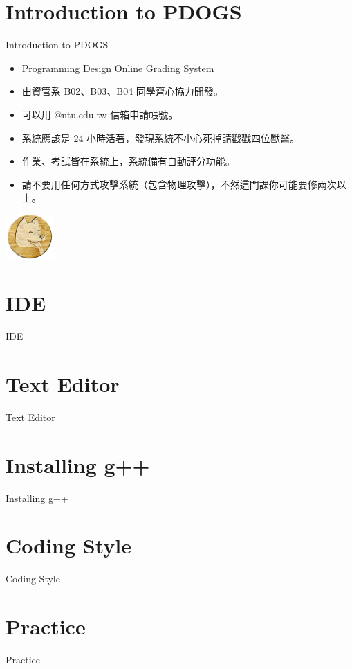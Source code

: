 \documentclass[t]{beamer}
\begin{document}
\section{Introduction to PDOGS}
\begin{frame}{Introduction to PDOGS}
\begin{itemize}
\item Programming Design Online Grading System
\item 由資管系 B02、B03、B04 同學齊心協力開發。
\item 可以用 @ntu.edu.tw 信箱申請帳號。
\item 系統應該是 24 小時活著，發現系統不小心死掉請戳戳四位獸醫。
\item 作業、考試皆在系統上，系統備有自動評分功能。
\item 請不要用任何方式攻擊系統（包含物理攻擊），不然這門課你可能要修兩次以上。
\end{itemize}
\begin{center}
\includegraphics[width=5em]{pdogs.png}
\end{center}
\end{frame}

\section{IDE}
\begin{frame}{IDE}
\end{frame}

\section{Text Editor}
\begin{frame}{Text Editor}
\end{frame}

\section{Installing g++}
\begin{frame}{Installing g++}
\end{frame}

\section{Coding Style}
\begin{frame}{Coding Style}
\end{frame}

\section{Practice}
\begin{frame}{Practice}
\end{frame}
\end{document}
